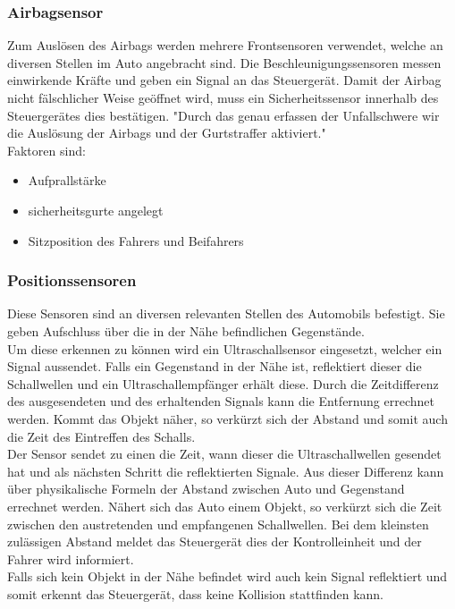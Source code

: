 \documentclass{article}
\begin{document}
			\subsubsection{Airbagsensor}
					Zum Auslösen des Airbags werden mehrere Frontsensoren verwendet, welche an diversen Stellen im Auto angebracht sind. Die Beschleunigungssensoren messen einwirkende Kräfte und geben ein Signal an das Steuergerät. Damit der Airbag nicht fälschlicher Weise geöffnet wird, muss ein Sicherheitssensor innerhalb des Steuergerätes dies bestätigen. "Durch das genau erfassen der Unfallschwere wir die Auslösung der Airbags und der Gurtstraffer aktiviert."\cite{TS32}\\
					Faktoren sind: 
					
					\begin{itemize}
						\item Aufprallstärke
						\item sicherheitsgurte angelegt
						\item Sitzposition des Fahrers und Beifahrers
					\end{itemize}
				
				
				\subsubsection{Positionssensoren}
					Diese Sensoren sind an diversen relevanten Stellen des Automobils befestigt. Sie geben Aufschluss über die in der Nähe befindlichen Gegenstände.\\
					Um diese erkennen zu können wird ein Ultraschallsensor eingesetzt, welcher ein Signal aussendet. Falls ein Gegenstand in der Nähe ist, reflektiert dieser die Schallwellen und ein Ultraschallempfänger erhält diese. Durch die Zeitdifferenz des ausgesendeten und des erhaltenden Signals kann die Entfernung errechnet werden. Kommt das Objekt näher, so verkürzt sich der Abstand und somit auch die Zeit des Eintreffen des Schalls.\\
					Der Sensor sendet zu einen die Zeit, wann dieser die Ultraschallwellen gesendet hat und als nächsten Schritt die reflektierten Signale. Aus dieser Differenz kann über physikalische Formeln der Abstand zwischen Auto und Gegenstand errechnet werden. Nähert sich das Auto einem Objekt, so verkürzt sich die Zeit zwischen den austretenden und empfangenen Schallwellen. Bei dem kleinsten zulässigen Abstand meldet das Steuergerät dies der Kontrolleinheit und der Fahrer wird informiert.\\
					Falls sich kein Objekt in der Nähe befindet wird auch kein Signal reflektiert und somit erkennt das Steuergerät, dass keine Kollision stattfinden kann.
				
\end{document}
